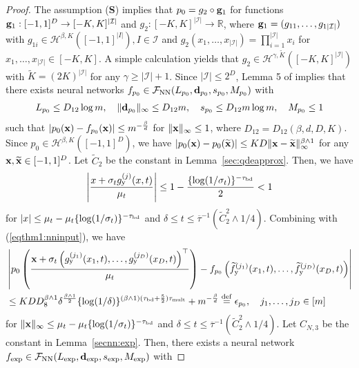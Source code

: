 \documentclass[twoside,11pt]{article}
\def\cF{\mathcal F}
\def\cH{\mathcal H}
\def\cI{\mathcal I}
\newcommand{\bd}{{\bf d}}
\newcommand{\bg}{{\bf g}}
\newcommand{\bS}{{\bf S}}
\newcommand{\bx}{{\bf x}}
\newcommand{\bbR}{{\mathbb R}}
\newcommand{\be}{\begin{equation}}
\newcommand{\ee}{\end{equation}}
\newcommand{\bean}{\setlength\arraycolsep{1pt}\begin{eqnarray*}}
\newcommand{\eean}{\end{eqnarray*}}
\def\defeq{ \stackrel{\rm def}{=} }
\begin{document}
\begin{proof}
The assumption (\bS) implies that $p_0 = g_{2} \circ \bg_{1}$ for functions $\bg_1: [-1,1]^{D} \to [-K,K]^{\vert \cI \vert}$ and $g_2 : [-K,K]^{\vert \cI \vert} \to \bbR$, where
$\bg_1 = (g_{11},\ldots, g_{1 \vert \cI \vert})$ with $g_{1i} \in \cH^{\beta,K}([-1,1]^{\vert I \vert}), I \in \cI$ and $g_2(x_1,\ldots,x_{\vert \cI \vert}) = \prod_{i=1}^{\vert \cI \vert} x_i$ for $x_1,\ldots,x_{\vert \cI \vert} \in [-K,K]$. A simple calculation yields that $g_2 \in \cH^{\gamma, \widetilde K}([-K,K]^{\vert \cI \vert})$ with $\widetilde K = (2K)^{\vert \cI \vert}$ for any $\gamma \geq \vert \cI \vert + 1$.
Since $\vert \cI \vert \leq 2^{D}$, Lemma 5 of \citet{chae2023likelihood} implies that there exists neural networks $f_{p_0} \in \cF_{\rm NN}(L_{p_0},\bd_{p_0},s_{p_0},M_{p_0})$ with
\bean
L_{p_0} \leq D_{12} \log m, \quad \| \bd_{p_0}\|_{\infty} \leq D_{12} m, \quad s_{p_0} \leq D_{12} m \log m, \quad M_{p_0} \leq 1
\eean
such that $ 
\vert p_0(\bx) - f_{p_0}(\bx) \vert \leq m^{-\frac{\beta}{d}}$
for $\| \bx \|_{\infty} \leq 1$, where $D_{12} = D_{12}(\beta,d,D,K)$. 
Since $p_0 \in \cH^{\beta,K}([-1,1]^{D})$, we have $\vert p_0(\bx) - p_0(\widetilde \bx)\vert \leq K D \| \bx - \widetilde \bx \|_{\infty}^{\beta \wedge 1}$ for any $\bx, \widetilde \bx \in [-1,1]^{D}$.
Let $\widetilde C_{2}$ be the constant in Lemma~\ref{sec:qdeapprox}.
Then, we have
\bean
\left\vert \frac{x+\sigma_t g_{\rm y}^{(j)}(x,t)  }{\mu_t} \right\vert \leq 1-\frac{ \{ \log(1/\sigma_{t}) \}^{-\tau_{\rm bd}}}{2} < 1
\eean
for $\vert x \vert \leq \mu_{t} - \mu_{t} \{ \log (1/\sigma_t)\}^{-\tau_{\rm bd}}$ and $\delta \leq t \leq \overline{\tau}^{-1}(\widetilde C_{2}^2 \wedge 1/4)$.
Combining with (\ref{eqthm1:nninput}), we have
\be \begin{split}
& \left\vert p_0 \left( \frac{\bx + \sigma_{t} \left( g_{\rm y}^{(j_1)}(x_1,t),\ldots,g_{\rm y}^{(j_D)} (x_D,t)  \right)^{\top} }{\mu_t} \right) - f_{p_0} \left( \widetilde f_{\rm y}^{(j_1)}(x_1,t),\ldots,\widetilde f_{\rm y}^{(j_D)}(x_D,t) \right) \right\vert
\\
& \leq K D D_{8}^{\beta \wedge 1} {\delta}^{\frac{\beta \wedge 1}{2}} \{\log(1/\delta)\}^{(\beta \wedge 1)(\tau_{\rm bd}+\frac{5}{2} )\tau_{\rm mult}}  + m^{-\frac{\beta}{d}} \defeq \epsilon_{p_0}, \quad j_{1}, \ldots, j_{D} \in [m] \label{eqthm1:nnp0}
\end{split}
\ee
for $\| \bx\|_{\infty} \leq \mu_t - \mu_t \{ \log (1/\sigma_{t})\}^{-\tau_{\rm bd}}$ and $\delta \leq t \leq \overline{\tau}^{-1}(\widetilde C_{2}^2 \wedge 1/4)$.
Let $C_{N,3}$ be the constant in Lemma~\ref{secnn:exp}. Then, there exists a neural network $f_{\rm exp} \in \cF_{\rm NN} ( L_{\rm exp} , \bd_{\rm exp} , s_{\rm exp} , M_{\rm exp} )$ with

\end{proof}
\end{document}
